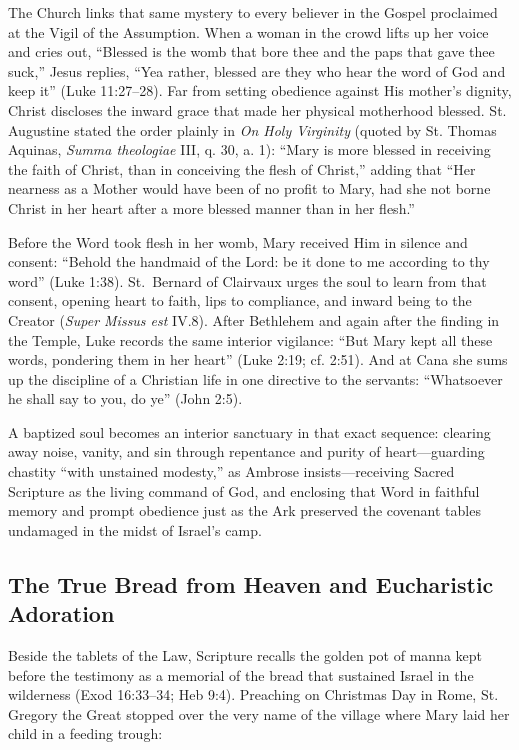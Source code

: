 The Church links that same mystery to every believer in the Gospel proclaimed at the Vigil of the Assumption. When a woman in the crowd lifts up her voice and cries out, ``Blessed is the womb that bore thee and the paps that gave thee suck,'' Jesus replies, ``Yea rather, blessed are they who hear the word of God and keep it'' (Luke 11:27--28). Far from setting obedience against His mother's dignity, Christ discloses the inward grace that made her physical motherhood blessed. St. Augustine stated the order plainly in \textit{On Holy Virginity} (quoted by St. Thomas Aquinas, \textit{Summa theologiae} III, q. 30, a. 1): ``Mary is more blessed in receiving the faith of Christ, than in conceiving the flesh of Christ,'' adding that ``Her nearness as a Mother would have been of no profit to Mary, had she not borne Christ in her heart after a more blessed manner than in her flesh.''

Before the Word took flesh in her womb, Mary received Him in silence and consent: ``Behold the handmaid of the Lord: be it done to me according to thy word'' (Luke 1:38). St.\ Bernard of Clairvaux urges the soul to learn from that consent, opening heart to faith, lips to compliance, and inward being to the Creator (\textit{Super Missus est} IV.8). After Bethlehem and again after the finding in the Temple, Luke records the same interior vigilance: ``But Mary kept all these words, pondering them in her heart'' (Luke 2:19; cf. 2:51). And at Cana she sums up the discipline of a Christian life in one directive to the servants: ``Whatsoever he shall say to you, do ye'' (John 2:5).

A baptized soul becomes an interior sanctuary in that exact sequence: clearing away noise, vanity, and sin through repentance and purity of heart---guarding chastity ``with unstained modesty,'' as Ambrose insists---receiving Sacred Scripture as the living command of God, and enclosing that Word in faithful memory and prompt obedience just as the Ark preserved the covenant tables undamaged in the midst of Israel's camp.

\subsection{The True Bread from Heaven and Eucharistic Adoration}\label{subsec:bread-and-adoration}

Beside the tablets of the Law, Scripture recalls the golden pot of manna kept before the testimony as a memorial of the bread that sustained Israel in the wilderness (Exod 16:33--34; Heb 9:4). Preaching on Christmas Day in Rome, St. Gregory the Great stopped over the very name of the village where Mary laid her child in a feeding trough:

